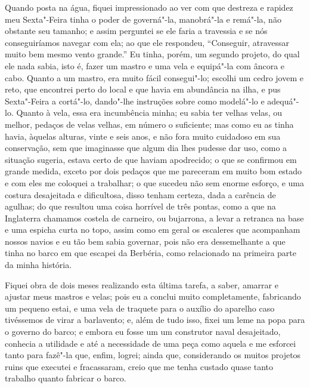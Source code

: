 Quando posta na água, fiquei impressionado ao ver com que destreza e
rapidez meu Sexta"-Feira tinha o poder de governá"-la, manobrá"-la e
remá"-la, não obstante seu tamanho; e assim perguntei se ele faria a
travessia e se nós conseguiríamos navegar com ela; ao que ele respondeu,
``Conseguir, atravessar muito bem mesmo vento grande.'' Eu tinha, porém,
um segundo projeto, do qual ele nada sabia, isto é, fazer um mastro e
uma vela e equipá"-la com âncora e cabo. Quanto a um mastro, era muito
fácil consegui"-lo; escolhi um cedro jovem e reto, que encontrei perto do
local e que havia em abundância na ilha, e pus Sexta"-Feira a cortá"-lo,
dando"-lhe instruções sobre como modelá"-lo e adequá"-lo. Quanto à vela,
essa era incumbência minha; eu sabia ter velhas velas, ou melhor,
pedaços de velas velhas, em número o suficiente; mas como eu as tinha
havia, àquelas alturas, vinte e seis anos, e não fora muito cuidadoso em
sua conservação, sem que imaginasse que algum dia lhes pudesse dar uso,
como a situação sugeria, estava certo de que haviam apodrecido; o que se
confirmou em grande medida, exceto por dois pedaços que me pareceram em
muito bom estado e com eles me coloquei a trabalhar; o que sucedeu não
sem enorme esforço, e uma costura desajeitada e dificultosa, disso
tenham certeza, dada a carência de agulhas; do que resultou uma coisa
horrível de três pontas, como a que na Inglaterra chamamos costela de
carneiro, ou bujarrona, a levar a retranca na base e uma espicha curta
no topo, assim como em geral os escaleres que acompanham nossos navios e
eu tão bem sabia governar, pois não era dessemelhante a que tinha no
barco em que escapei da Berbéria, como relacionado na primeira parte da
minha história.

Fiquei obra de dois meses realizando esta última tarefa, a saber,
amarrar e ajustar meus mastros e velas; pois eu a conclui muito
completamente, fabricando um pequeno estai, e uma vela de traquete para
o auxílio do aparelho caso tivéssemos de virar a barlavento; e, além de
tudo isso, fixei um leme na popa para o governo do barco; e embora eu
fosse um um construtor naval desajeitado, conhecia a utilidade e até a
necessidade de uma peça como aquela e me esforcei tanto para fazê"-la
que, enfim, logrei; ainda que, considerando os muitos projetos ruins que
executei e fracassaram, creio que me tenha custado quase tanto trabalho
quanto fabricar o barco.

